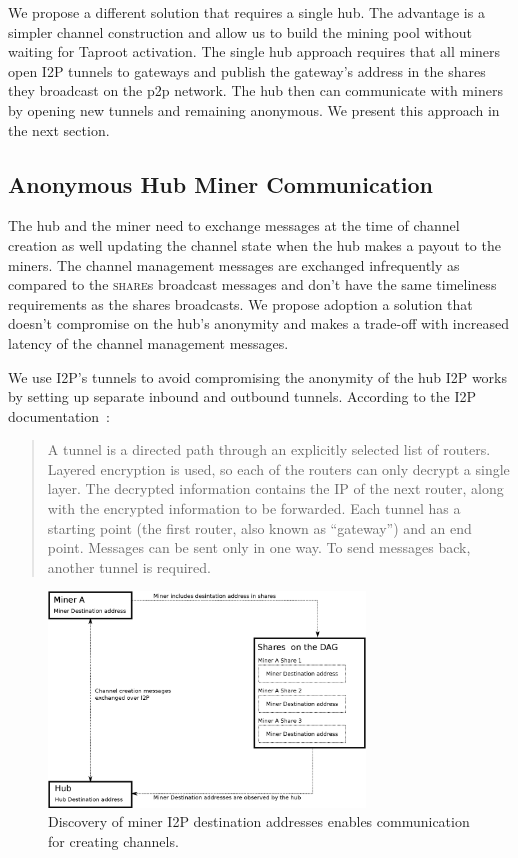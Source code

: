 \documentclass{article}
\begin{document}
We propose a different solution that requires a single hub. The
advantage is a simpler channel construction and allow us to build the
mining pool without waiting for Taproot activation. The single hub
approach requires that all miners open I2P tunnels to gateways and
publish the gateway's address in the shares they broadcast on the p2p
network. The hub then can communicate with miners by opening new
tunnels and remaining anonymous. We present this approach in the next
section.

\subsection{Anonymous Hub Miner
  Communication}\label{sec:hub-miner-communication}

The hub and the miner need to exchange messages at the time of channel
creation as well updating the channel state when the hub makes a
payout to the miners. The channel management messages are exchanged
infrequently as compared to the \textsc{share}s broadcast messages and
don't have the same timeliness requirements as the shares
broadcasts. We propose adoption a solution that doesn't compromise on
the hub's anonymity and makes a trade-off with increased latency of
the channel management messages.

We use I2P's tunnels to avoid compromising the anonymity of the hub
I2P works by setting up separate inbound and outbound
tunnels. According to the I2P documentation~\cite{i2p-tech-intro}:

\begin{quote}
  A tunnel is a directed path through an explicitly selected list of
  routers. Layered encryption is used, so each of the routers can only
  decrypt a single layer. The decrypted information contains the IP of
  the next router, along with the encrypted information to be
  forwarded. Each tunnel has a starting point (the first router, also
  known as ``gateway'') and an end point. Messages can be sent only in
  one way. To send messages back, another tunnel is required.
\end{quote}

\begin{figure}
  \begin{center}
    \includegraphics[width=0.75\textwidth]{new-miner-communication.eps}
    \caption{Discovery of miner I2P destination addresses enables
      communication for creating channels.}\label{fig:new-miner-communication}
  \end{center}
\end{figure}
\end{document}
